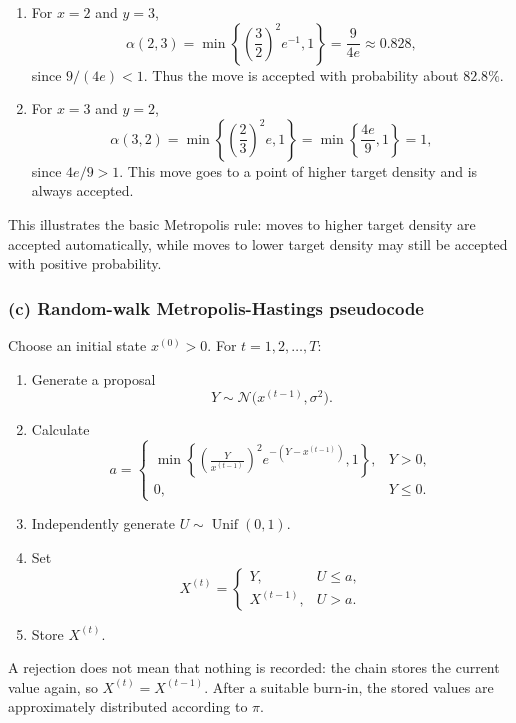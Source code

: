 \documentclass[11pt,a4paper]{article}
\begin{document}
\begin{enumerate}[label=\arabic*.,leftmargin=*]
  \item For $x=2$ and $y=3$,
        \[
          \alpha(2,3)
          =\min\left\{\left(\frac32\right)^2e^{-1},1\right\}
          =\boxed{\frac{9}{4e}\approx0.828},
        \]
        since $9/(4e)<1$. Thus the move is accepted with probability about
        $82.8\%$.

  \item For $x=3$ and $y=2$,
        \[
          \alpha(3,2)
          =\min\left\{\left(\frac23\right)^2e,1\right\}
          =\min\left\{\frac{4e}{9},1\right\}
          =\boxed{1},
        \]
        since $4e/9>1$. This move goes to a point of higher target density and
        is always accepted.
\end{enumerate}

This illustrates the basic Metropolis rule: moves to higher target density
are accepted automatically, while moves to lower target density may still be
accepted with positive probability.

\subsubsection*{(c) Random-walk Metropolis-Hastings pseudocode}

Choose an initial state $x^{(0)}>0$. For $t=1,2,\ldots,T$:
\begin{enumerate}[label=\arabic*.,leftmargin=*]
  \item Generate a proposal
        \[
          Y\sim\mathcal{N}\bigl(x^{(t-1)},\sigma^2\bigr).
        \]
  \item Calculate
        \[
          a=
          \begin{cases}
            \displaystyle
            \min\left\{
              \left(\frac{Y}{x^{(t-1)}}\right)^2
              e^{-(Y-x^{(t-1)})},1
            \right\}, & Y>0,\\[1.2em]
            0, & Y\leq0.
          \end{cases}
        \]
  \item Independently generate $U\sim\operatorname{Unif}(0,1)$.
  \item Set
        \[
          X^{(t)}=
          \begin{cases}
            Y, & U\leq a,\\
            X^{(t-1)}, & U>a.
          \end{cases}
        \]
  \item Store $X^{(t)}$.
\end{enumerate}
A rejection does not mean that nothing is recorded: the chain stores the
current value again, so $X^{(t)}=X^{(t-1)}$. After a suitable burn-in, the
stored values are approximately distributed according to $\pi$.
\end{document}
